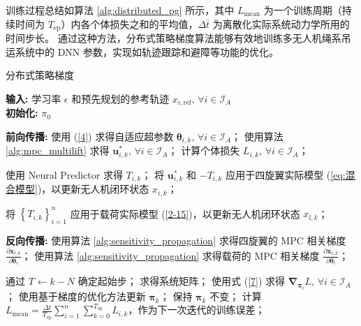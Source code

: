 \documentclass[lang=chs, degree=master, blindreview=true, winfonts=true]{yanputhesis}
\begin{document}
训练过程总结如算法 \ref{alg:distributed_pg} 所示，其中 $L_{\text{mean}}$ 为一个训练周期（持续时间为 $T_{\text{ep}}$）内各个体损失之和的平均值，$\Delta \bar{t}$ 为离散化实际系统动力学所用的时间步长。
通过这种方法，分布式策略梯度算法能够有效地训练多无人机绳系吊运系统中的 DNN 参数，实现如轨迹跟踪和避障等功能的优化。

\begin{algorithm}[h]
    \caption{分布式策略梯度}
    \label{alg:distributed_pg}
    \textbf{输入:} 学习率 $\epsilon$ 和预先规划的参考轨迹 $x_{i,{\text{ref}}}, \, \forall i \in \mathcal{I}_A$\\
    \textbf{初始化:} $\pi_0$
    
    \begin{algorithmic}[1]
                \State \textbf{前向传播:}
                \State 使用 (\ref{4}) 求得自适应超参数 $\bm{\theta}_{i,k}, \, \forall i \in \mathcal{I}_A$；
                \State 使用算法 \ref{alg:mpc_multilift} 求得 $\bm{u}_{i,k}^{\ast}, \, \forall i \in \mathcal{I}_A$；
                \State 计算个体损失 $L_{i,k}, \, \forall i \in \mathcal{I}_A$；
                
                    \State 使用 Neural Predictor 求得 $T_{i,k}$；
                    \State 将 $\bm{u}_{i,k}^{\ast}$ 和 $-T_{i,k}$ 应用于四旋翼实际模型 (\ref{eq:混合模型})，以更新无人机闭环状态 $x_{i,k}$；
                \EndFor
                
                \State 将 $\left\{ T_{i,k} \right\}_{i=1}^n$ 应用于载荷实际模型 (\ref{2-15})，以更新无人机闭环状态 $x_{l,k}$；
                
                \State \textbf{反向传播:}
                    \State 使用算法 \ref{alg:sensitivity_propagation} 求得四旋翼的 MPC 相关梯度 $\frac{\partial \bm{x}_{l,k}}{\partial \bm{\theta}_i}$；
                    \State 使用算法 \ref{alg:sensitivity_propagation} 求得载荷的 MPC 相关梯度 $\frac{\partial \bm{x}_{i,k}}{\partial \bm{\theta}_l}$；
                \EndFor
                
                    \State 通过 $T_{\text{}} \gets k - N$ 确定起始步；
                    \State 求得系统矩阵；
                    \State 使用式 (\ref{7}) 求得 $\bm{\nabla}_{\bm{\pi}_i} L, \, \forall i \in \mathcal{I}_A$；
                    \State 使用基于梯度的优化方法更新 $\bm{\pi}_k$；
                \Else
                    \State 保持 $\bm{\pi}_k$ 不变；
                \EndIf
            \EndFor
            \State 计算 $L_{\text{mean}} = \frac{\Delta t}{T_{\text{ep}}} \sum_{i=1}^n \sum_{k=0}^{T_{\text{ep}}} L_{i,k}$，作为下一次迭代的训练误差；
        \EndWhile
    \end{algorithmic}
\end{algorithm}
\end{document}
